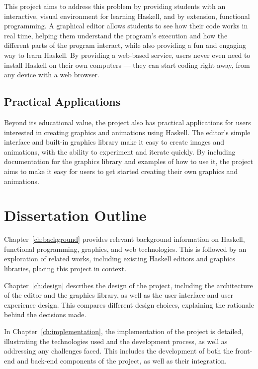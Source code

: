 \documentclass[../main.tex]{subfiles}
\begin{document}
            This project aims to address this problem by providing students with an
                interactive, visual environment for learning Haskell, and by extension,
                functional programming.
            A graphical editor allows students to see how their code works in real time,
                helping them understand the program's execution and how the different parts of
                the program interact, while also providing a fun and engaging way to learn
                Haskell.
            By providing a web-based service, users never even need to install Haskell on
                their own computers — they can start coding right away, from any device with a
                web browser.

        \subsection{Practical Applications}
            Beyond its educational value, the project also has practical applications for
                users interested in creating graphics and animations using Haskell.
            The editor's simple interface and built-in graphics library make it easy to
                create images and animations, with the ability to experiment and iterate
                quickly.
            By including documentation for the graphics library and examples of how to use
                it, the project aims to make it easy for users to get started creating their
                own graphics and animations.

    \section{Dissertation Outline}
        Chapter~\ref{ch:background} provides relevant background information on
            Haskell, functional programming, graphics, and web technologies.
        This is followed by an exploration of related works, including existing Haskell
            editors and graphics libraries, placing this project in context.

        Chapter~\ref{ch:design} describes the design of the project, including the
            architecture of the editor and the graphics library, as well as the user
            interface and user experience design.
        This compares different design choices, explaining the rationale behind the
            decisions made.

        In Chapter~\ref{ch:implementation}, the implementation of the project is
            detailed, illustrating the technologies used and the development process, as
            well as addressing any challenges faced.
        This includes the development of both the front-end and back-end components of
            the project, as well as their integration.
\end{document}
